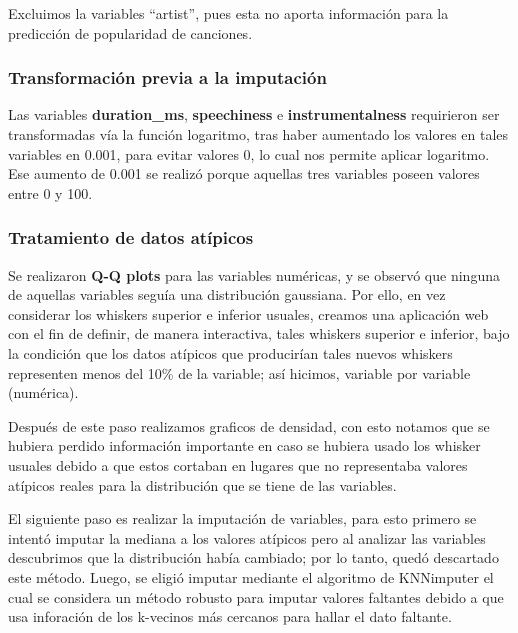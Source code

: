 \documentclass[
  letterpaper,
  DIV=11,
  numbers=noendperiod]{scrartcl}
\begin{document}
Excluimos la variables ``artist'', pues esta no aporta información para
la predicción de popularidad de canciones.

\hypertarget{transformaciuxf3n-previa-a-la-imputaciuxf3n}{%
\subsubsection{Transformación previa a la
imputación}\label{transformaciuxf3n-previa-a-la-imputaciuxf3n}}

Las variables \textbf{duration\_ms}, \textbf{speechiness} e
\textbf{instrumentalness} requirieron ser transformadas vía la función
logaritmo, tras haber aumentado los valores en tales variables en 0.001,
para evitar valores 0, lo cual nos permite aplicar logaritmo. Ese
aumento de 0.001 se realizó porque aquellas tres variables poseen
valores entre 0 y 100.

\hypertarget{tratamiento-de-datos-atuxedpicos}{%
\subsubsection{Tratamiento de datos
atípicos}\label{tratamiento-de-datos-atuxedpicos}}

Se realizaron \textbf{Q-Q plots} para las variables numéricas, y se
observó que ninguna de aquellas variables seguía una distribución
gaussiana. Por ello, en vez considerar los whiskers superior e inferior
usuales, creamos una aplicación web con el fin de definir, de manera
interactiva, tales whiskers superior e inferior, bajo la condición que
los datos atípicos que producirían tales nuevos whiskers representen
menos del 10\% de la variable; así hicimos, variable por variable
(numérica).

Después de este paso realizamos graficos de densidad, con esto notamos
que se hubiera perdido información importante en caso se hubiera usado
los whisker usuales debido a que estos cortaban en lugares que no
representaba valores atípicos reales para la distribución que se tiene
de las variables.

El siguiente paso es realizar la imputación de variables, para esto
primero se intentó imputar la mediana a los valores atípicos pero al
analizar las variables descubrimos que la distribución había cambiado;
por lo tanto, quedó descartado este método. Luego, se eligió imputar
mediante el algoritmo de KNNimputer el cual se considera un método
robusto para imputar valores faltantes debido a que usa inforación de
los k-vecinos más cercanos para hallar el dato faltante.
\end{document}
